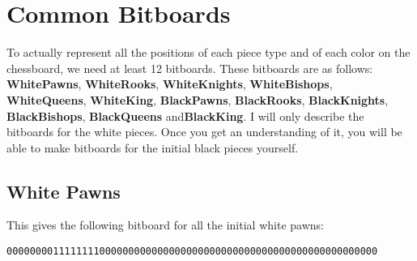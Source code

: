 \section{Common Bitboards}
To actually represent all the positions of each piece type and of each color on the chessboard, we need at least 12 bitboards. 
These bitboards are as follows:	\textbf{WhitePawns}, \textbf{WhiteRooks}, \textbf{WhiteKnights}, \textbf{WhiteBishops}, \textbf{WhiteQueens}, \textbf{WhiteKing}, \textbf{BlackPawns}, \textbf{BlackRooks}, \textbf{BlackKnights}, \textbf{BlackBishops}, \textbf{BlackQueens} and\textbf{BlackKing}.
I will only describe the bitboards for the white pieces.
Once you get an understanding of it, you will be able to make bitboards for the initial black pieces yourself.

\subsection{White Pawns}
%
\begin{figure}[H]
	\centering
\end{figure}
%
This gives the following bitboard for all the initial white pawns:
%
\begin{center}
	\texttt{0000000011111111000000000000000000000000000000000000000000000000}
\end{center}
%

